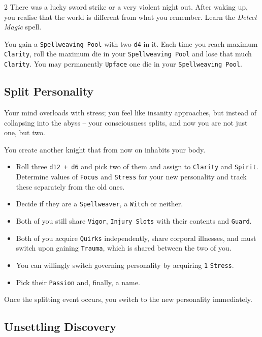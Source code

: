 \begin{multicols*}{2}
    There was a lucky sword strike or a very violent night out. After waking up, you realise that the world is different from what you remember. 
    Learn the \textit{Detect Magic} spell.

    You gain a \texttt{Spellweaving Pool} with two \texttt{d4} in it. 
    Each time you reach maximum \texttt{Clarity}, roll the maximum die in your \texttt{Spellweaving Pool} and lose that much \texttt{Clarity}. 
    You may permanently \texttt{Upface} one die in your \texttt{Spellweaving Pool}. 

    \newcolumn

    \subsection*{Split Personality}

    Your mind overloads with stress; you feel like insanity approaches, but instead of collapsing into the abyss -- your consciousness splits, and now you are not just one, but two.

    You create another knight that from now on inhabits your body. 

    \begin{itemize}[nosep, leftmargin=*]
        \item Roll three \texttt{d12 + d6} and pick two of them and assign to \texttt{Clarity} and \texttt{Spirit}. Determine values of \texttt{Focus} and \texttt{Stress} for your new personality and track these separately from the old ones.
        \item Decide if they are a \texttt{Spellweaver}, a \texttt{Witch} or neither.
        \item Both of you still share \texttt{Vigor}, \texttt{Injury Slots} with their contents and \texttt{Guard}.
        \item Both of you acquire \texttt{Quirks} independently, share corporal illnesses, and must switch upon gaining \texttt{Trauma}, which is shared between the two of you.
        \item You can willingly switch governing personality by acquiring \texttt{1} \texttt{Stress}.
        \item Pick their \texttt{Passion} and, finally, a name. 
    \end{itemize}
Once the splitting event occurs, you switch to the new personality immediately. 


    \subsection*{Unsettling Discovery}


\end{multicols*}
